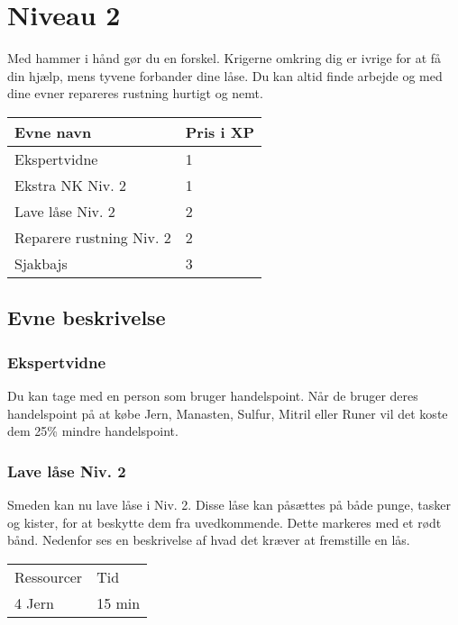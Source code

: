 \chapter*{Niveau 2}
Med hammer i hånd gør du en forskel. Krigerne omkring dig er ivrige for at få din hjælp, mens tyvene forbander dine låse. Du kan altid finde arbejde og med dine evner repareres rustning hurtigt og nemt.
\begin{table}[H]
    \centering
    \begin{tabular}{|p{}|p{}|}
    \rowcolor{cerulean!80}\hline
    Evne navn & Pris i XP \\\hline
    Ekspertvidne & 1 \\\hline
    Ekstra NK Niv. 2 & 1\\\hline
    Lave låse Niv. 2 & 2\\\hline
    Reparere rustning Niv. 2 & 2\\\hline
    Sjakbajs & 3 \\\hline
    \end{tabular}
\end{table}
\section*{Evne beskrivelse}

\subsection*{Ekspertvidne}
Du kan tage med en person som bruger handelspoint. Når de bruger deres handelspoint på at købe Jern, Manasten, Sulfur, Mitril eller Runer vil det koste dem 25\% mindre handelspoint.



\subsection*{Lave låse Niv. 2}
Smeden kan nu lave låse i Niv. 2. Disse låse kan påsættes på både punge, tasker og kister, for at beskytte dem fra uvedkommende. Dette markeres med et rødt bånd. Nedenfor ses en beskrivelse af hvad det kræver at fremstille en lås.\\

\begin{table}[H]
    \centering
    \begin{tabular}{|p{}|p{}|}
    \hline
    \rowcolor{cerulean!80}
    \multicolumn{2}{c}{Lås Niv. 2}\\
    \hline
    \rowcolor{cerulean!40}
         Ressourcer & Tid \\\hline
         4 Jern & 15 min\\\hline
    \end{tabular}
    \end{table}
    
